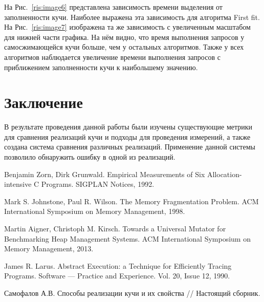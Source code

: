    На Рис.~\ref{ris:image6} представлена зависимость времени выделения от заполненности кучи. Наиболее выражена эта зависимость для 
алгоритма First fit. На Рис.~\ref{ris:image7} изображена та же зависимость с увеличенным масштабом для нижней части графика. 
На нём видно, что время выполнения запросов у самосжимающейся кучи больше, чем у остальных алгоритмов. Также у всех алгоритмов наблюдается 
увеличение времени выполнения запросов с приближением заполненности кучи к наибольшему значению.
   
\section*{Заключение}
   
В результате проведения данной работы были изучены существующие метрики для сравнения реализаций кучи и подходы для проведения измерений,
а также создана система сравнения различных реализаций. Применение данной системы позволило обнаружить ошибку в одной из
реализаций.

\begin{thebibliography}{99}
Benjamin Zorn, Dirk Grunwald.
Empirical Measurements of Six Allocation-intensive C Programs. SIGPLAN Notices, 1992.

Mark S. Johnstone, Paul R. Wilson.
The Memory Fragmentation Problem. ACM International Symposium on Memory Management, 1998.

Martin Aigner, Christoph M. Kirsch. Towards a Universal Mutator for Benchmarking Heap Management Systems.
ACM International Symposium on Memory Management, 2013.

James R. Larus. Abstract Execution: a Technique for Efficiently Tracing Programs.
Software --- Practice and Experience. Vol. 20, Issue 12, 1990.

Самофалов А.В. Способы реализации кучи и их свойства // Настоящий сборник.
\end{thebibliography}

